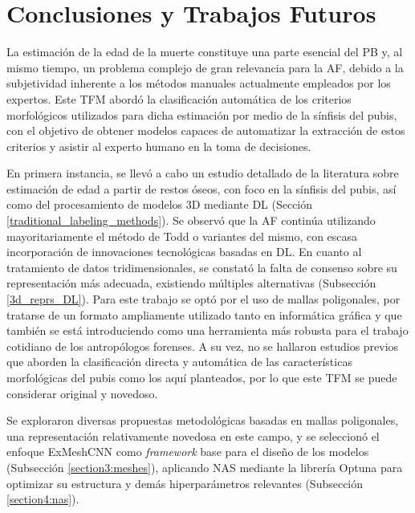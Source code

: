 \chapter{Conclusiones y Trabajos Futuros}

La estimación de la edad de la muerte constituye una parte esencial del PB y, al mismo tiempo, un problema complejo de gran relevancia para la AF, debido a la subjetividad inherente a los métodos manuales actualmente empleados por los expertos. Este TFM abordó la clasificación automática de los criterios morfológicos utilizados para dicha estimación por medio de la sínfisis del pubis, con el objetivo de obtener modelos capaces de automatizar la extracción de estos criterios y asistir al experto humano en la toma de decisiones.

En primera instancia, se llevó a cabo un estudio detallado de la literatura sobre estimación de edad a partir de restos óseos, con foco en la sínfisis del pubis, así como del procesamiento de modelos 3D mediante DL (Sección \ref{traditional_labeling_methods}). Se observó que la AF continúa utilizando mayoritariamente el método de Todd \cite{RefWorks:RefID:19-todd1921age} o variantes del mismo, con escasa incorporación de innovaciones tecnológicas basadas en DL. En cuanto al tratamiento de datos tridimensionales, se constató la falta de consenso sobre su representación más adecuada, existiendo múltiples alternativas (Subsección \ref{3d_reprs_DL}). Para este trabajo se optó por el uso de mallas poligonales, por tratarse de un formato ampliamente utilizado tanto en informática gráfica y que también se está introduciendo como una herramienta más robusta para el trabajo cotidiano de los antropólogos forenses. A su vez, no se hallaron estudios previos que aborden la clasificación directa y automática de las características morfológicas del pubis como los aquí planteados, por lo que este TFM se puede considerar original y novedoso.

Se exploraron diversas propuestas metodológicas basadas en mallas poligonales, una representación relativamente novedosa en este campo, y se seleccionó el enfoque ExMeshCNN \cite{kim_exmeshcnn_2022} como \textit{framework} base para el diseño de los modelos (Subsección \ref{section3:meshes}), aplicando NAS mediante la librería Optuna \cite{optuna_2019} para optimizar su estructura y demás hiperparámetros relevantes (Subsección \ref{section4:nas}).

